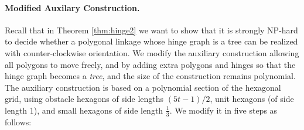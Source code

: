 \paragraph{Modified Auxilary Construction.}


Recall that in Theorem \ref{thm:hinge2} we want to show that it is strongly NP-hard to decide whether a polygonal linkage whose hinge graph is a tree can be realized with counter-clockwise orientation.
We modify the auxiliary construction allowing all polygons to move freely, and by adding extra polygons and hinges so that the hinge graph becomes a \emph{tree}, and the size of the construction remains polynomial. 
The auxiliary construction is based on a polynomial section of the hexagonal grid, using obstacle hexagons of side lengths $(5t-1)/2$, unit hexagons (of side length 1), and small hexagons of side length $\frac{1}{3}$. 
We modify it in five steps as follows:

